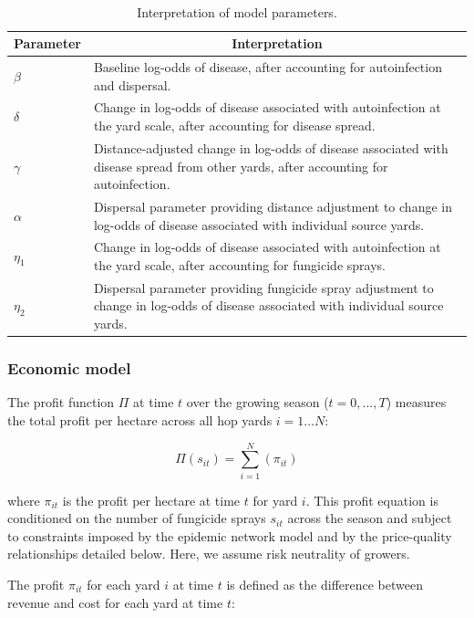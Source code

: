 \documentclass[10pt,a4paper]{article}
\begin{document}
\\



\begin{table}[ht]
\centering
\caption{Interpretation of model parameters.}
\label{tab:table2}
\begin{tabular}{lp{}}
\hline
Parameter & \multicolumn{1}{c}{Interpretation} \\
\hline
$\beta$ & Baseline log-odds of disease, after accounting for autoinfection and dispersal.\\
$\delta$ & Change in log-odds of disease associated with autoinfection at the yard scale, after accounting for disease spread.\\
$\gamma$ & Distance-adjusted change in log-odds of disease associated with disease spread from other yards, after accounting for autoinfection.\\
$\alpha$ & Dispersal parameter providing distance adjustment to change in log-odds of disease associated with individual source yards. \\
$\eta_1$ & Change in log-odds of disease associated with autoinfection at the yard scale, after accounting for fungicide sprays.\\
$\eta_2$ & Dispersal parameter providing fungicide spray adjustment to change in log-odds of disease associated with individual source yards. \\
\hline
\end{tabular}
\end{table}

\subsubsection{Economic model}

The profit function $\Pi$ at time $t$ over the growing season ($t=0,...,T$) measures the total profit per hectare across all hop yards $i = 1 \ldots N$:

$$\Pi(s_{i t}) = \sum_{i=1}^N (\pi_{i t})$$

where $\pi_{it}$ is the profit per hectare at time $t$ for yard $i$. This profit equation is conditioned on the number of fungicide sprays $s_{it}$ across the season and subject to constraints imposed by the epidemic network model and by the price-quality relationships detailed below. Here, we assume risk neutrality of growers.

The profit $\pi_{i t}$ for each yard $i$ at time $t$ is defined as the difference between revenue and cost for each yard at time $t$:
\end{document}
